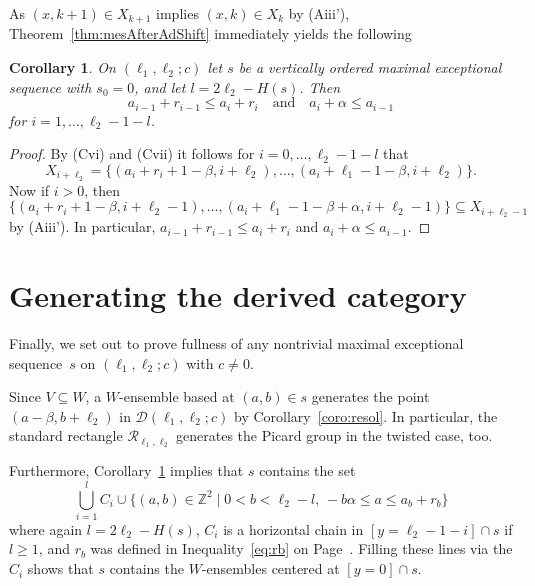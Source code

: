 \documentclass[11pt]{article}
\newtheorem{coro}[theo]{Corollary}
\theoremstyle{definition}
\numberwithin{equation}{section}
\newcommand{\Z}{\mathbb Z}
\newcommand{\CD}{{\mathcal D}}
\newcommand{\CR}{{\mathcal R}}
\newcommand{\xa}{\alpha}
\newcommand{\xb}{\beta}
\newcommand{\cl}{s}
\newcommand{\Rect}{\CR}
\newcommand{\nl}{{l}}
\newcommand{\mes}{maximal exceptional sequence}
\newcommand{\wbox}{ensemble}
\begin{document}
{As} $(x,k+1)\in X_{k+1}$
implies $(x,k)\in X_k$ by (Aiii'), 
Theorem~\ref{thm:mesAfterAdShift}
immediately yields the following 

\begin{coro}
\label{coro:ExtWBox}
On $(\ell_1,\ell_2;c)$ let $\cl$ be a vertically ordered {\mes} 
with $\cl_0=0$, and let $\nl=2\ell_2-H(\cl)$. Then
$$
a_{i-1}+r_{i-1}\leq a_i+r_i\quad\mbox{and}\quad 
a_i+\xa\leq a_{i-1}
$$
for $i=1,\ldots,\ell_2-1-\nl$.
\end{coro}

\begin{proof}
By (Cvi) and (Cvii) it follows for $i=0,\ldots,\ell_2-1-\nl$ that
$$
X_{i+\ell_2}=\{(a_i+r_i+1-\xb,i+\ell_2),\ldots,
(a_i+\ell_1-1-\xb,i+\ell_2)\}.
$$
Now if $i>0$, then 
$$
\{(a_i+r_i+1-\xb,i+\ell_2-1),\ldots,
(a_i+\ell_1-1-\xb+\xa,i+\ell_2-1)\}\subseteq X_{i+\ell_2-1}
$$
by (Aiii'). In particular, $a_{i-1}+r_{i-1}\leq a_i+r_i$ and
$a_i+\xa\leq a_{i-1}$.
\end{proof}

\section{Generating the derived category}
\label{sec:GenDerCat}
Finally, we set out to prove fullness of any nontrivial 
{\mes}~$\cl$ on $(\ell_1,\ell_2;c)$ with $c\not=0$. 

{Since $V\subseteq W$, 
a $W$-{\wbox} based at $(a,b)\in\cl$ generates 
the point $(a-\xb,b+\ell_2)$ in $\CD(\ell_1,\ell_2;c)$
by Corollary~\ref{coro:resol}.} In particular, 
the standard rectangle $\Rect_{\ell_1,\ell_2}$ generates
the Picard group in the twisted case, too.

Furthermore, Corollary~\ref{coro:ExtWBox} implies
that $\cl$ contains the set
\begin{equation}
\label{eq:ExtWbox}
\bigcup_{i=1}^\nl C_i
\cup\{(a,b)\in\Z^2\mid0<b<\ell_2-\nl,\,
-b\xa\leq a\leq a_b+r_b\}
\end{equation}{where again $\nl=2\ell_2-H(\cl)$, $C_i$ is a horizontal 
chain in $[y=\ell_2-1-i]\cap\cl$ if $\nl\geq1$, and $r_b$ was defined in Inequality~\eqref{eq:rb} on Page~\pageref{eq:rb}.}
Filling these lines via the $C_i$ shows that $\cl$
contains the $W$-{\wbox}s centered at $[y=0]\cap\cl$.
\end{document}
